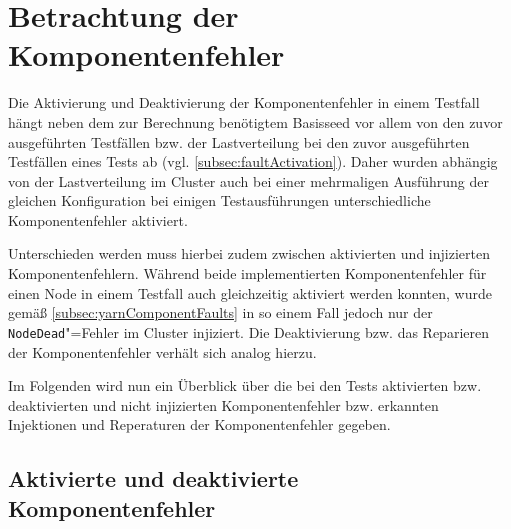 \section{Betrachtung der Komponentenfehler}
\label{sec:faultEval}

Die Aktivierung und Deaktivierung der Komponentenfehler in einem \gls{Testfall} hängt neben dem zur Berechnung benötigtem Basisseed vor allem von den zuvor ausgeführten Testfällen bzw. der Lastverteilung bei den zuvor ausgeführten Testfällen eines \glspl{Test} ab (vgl. \cref{subsec:faultActivation}).
Daher wurden abhängig von der Lastverteilung im Cluster auch bei einer mehrmaligen Ausführung der gleichen Konfiguration bei einigen Testausführungen unterschiedliche Komponentenfehler aktiviert.

Unterschieden werden muss hierbei zudem zwischen aktivierten und injizierten Komponentenfehlern.
Während beide implementierten Komponentenfehler für einen Node in einem \gls{Testfall} auch gleichzeitig aktiviert werden konnten, wurde gemäß \cref{subsec:yarnComponentFaults} in so einem Fall jedoch nur der \texttt{NodeDead}"=Fehler im Cluster injiziert.
Die Deaktivierung bzw. das Reparieren der Komponentenfehler verhält sich analog hierzu.

Im Folgenden wird nun ein Überblick über die bei den \glspl{Test} aktivierten bzw. deaktivierten und nicht injizierten Komponentenfehler bzw. erkannten Injektionen und Reperaturen der Komponentenfehler gegeben.

\subsection{Aktivierte und deaktivierte Komponentenfehler}
\label{subsec:actDeactFaults}

